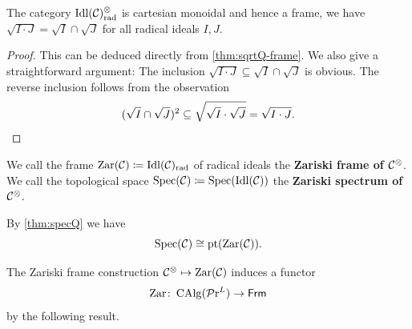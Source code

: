 \documentclass[10pt,a4paper,oneside]{article}
\begin{document}

\begin{thm}
The category $\operatorname{Idl}(\mathcal{C})_{\operatorname{rad}}^\otimes$ is cartesian monoidal and hence a frame, \ie we have $\sqrt{I\cdot J}=\sqrt{I}\cap\sqrt{J}$ for all radical ideals $I,J$.
\end{thm}
\begin{proof}
This can be deduced directly from \cref{thm:sqrtQ-frame}. We also give a straightforward argument: The inclusion $\sqrt{I\cdot J}\subseteq\sqrt{I}\cap\sqrt{J}$ is obvious. The reverse inclusion follows from the observation
\[
(\sqrt{I}\cap\sqrt{J})^2\subseteq \sqrt{\sqrt{I}\cdot \sqrt{J}}= \sqrt{I\cdot J}.\qedhere
\]
\end{proof}

\begin{de}\label{de:zariski-frame}
We call the frame $\operatorname{Zar}(\mathcal C) \coloneqq \operatorname{Idl}(\mathcal{C})_{\operatorname{rad}}$ of radical ideals the \textbf{Zariski frame of $\mathcal{C}^\otimes$}. We call the topological space $\operatorname{Spec}(\mathcal C) \coloneqq \operatorname{Spec}(\operatorname{Idl}(\mathcal{C}))$ the \textbf{Zariski spectrum of $\mathcal C^\otimes$}.
\end{de}

\begin{rem}\label{rem:spec-pt-zar}
By \cref{thm:specQ} we have
\[
\operatorname{Spec}(\mathcal C) \cong \operatorname{pt}(\operatorname{Zar}(\mathcal{C})).
\]
\end{rem}

\begin{rem}
The Zariski frame construction $\mathcal{C}^\otimes\mapsto \operatorname{Zar}(\mathcal C)$ induces a functor
\[
\operatorname{Zar}\colon \operatorname{CAlg}(\mathcal{P}\mathrm{r}^L)\to \mathsf{Frm}
\]
by the following result.
\end{rem}
\end{document}
